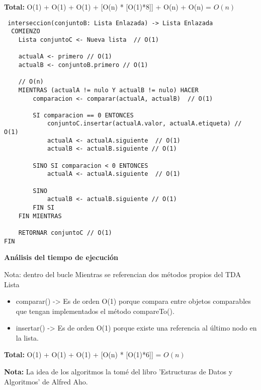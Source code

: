 \documentclass[12pt,letterpaper, onecolumn]{exam}
\begin{document}
\begin{questions}
\begin{solution}
    \textbf{Total:} O(1) + O(1) + O(1) + [O(n) * [O(1)*8]] + O(n) + O(n) = $O(n)$

    \newpage
  \begin{verbatim}
 interseccion(conjuntoB: Lista Enlazada) -> Lista Enlazada 
  COMIENZO
    Lista conjuntoC <- Nueva lista  // O(1) 
    
    actualA <- primero // O(1) 
    actualB <- conjuntoB.primero // O(1) 
    
    // O(n)
    MIENTRAS (actualA != nulo Y actualB != nulo) HACER
        comparacion <- comparar(actualA, actualB)  // O(1)
        
        SI comparacion == 0 ENTONCES
            conjuntoC.insertar(actualA.valor, actualA.etiqueta) // O(1) 
            actualA <- actualA.siguiente  // O(1) 
            actualB <- actualB.siguiente // O(1)
        
        SINO SI comparacion < 0 ENTONCES
            actualA <- actualA.siguiente  // O(1) 
        
        SINO
            actualB <- actualB.siguiente // O(1) 
        FIN SI
    FIN MIENTRAS

    RETORNAR conjuntoC // O(1)
FIN 
  \end{verbatim}
    \textbf{Análisis del tiempo de ejecución} 

Nota: dentro del bucle Mientras se referencian dos métodos propios del TDA Lista
    \begin{itemize}
      \item comparar() -> Es de orden O(1) porque compara entre objetos comparables que tengan implementados el método compareTo().
      \item insertar() -> Es de orden O(1) porque existe una referencia al último nodo en la lista.
    \end{itemize}

    \textbf{Total:} O(1) + O(1) + O(1) + [O(n) * [O(1)*6]] = $O(n)$
        \end{solution}
\end{questions}

\textbf{Nota:} La idea de los algoritmos la tomé del libro 'Estructuras de Datos y Algoritmos' de Alfred Aho. 
\end{document}
